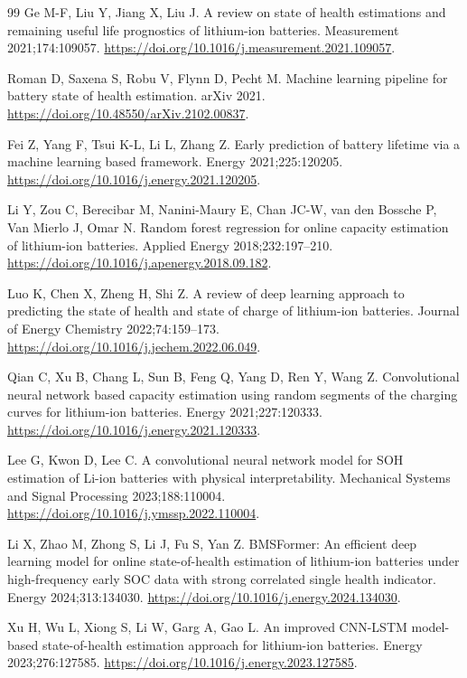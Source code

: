 \begin{thebibliography}{99}
 Ge M-F, Liu Y, Jiang X, Liu J. A review on state of health estimations and remaining useful life prognostics of lithium-ion batteries. Measurement 2021;174:109057. \url{https://doi.org/10.1016/j.measurement.2021.109057}.

 Roman D, Saxena S, Robu V, Flynn D, Pecht M. Machine learning pipeline for battery state of health estimation. arXiv 2021. \url{https://doi.org/10.48550/arXiv.2102.00837}.

 Fei Z, Yang F, Tsui K-L, Li L, Zhang Z. Early prediction of battery lifetime via a machine learning based framework. Energy 2021;225:120205. \url{https://doi.org/10.1016/j.energy.2021.120205}.

 Li Y, Zou C, Berecibar M, Nanini-Maury E, Chan JC-W, van den Bossche P, Van Mierlo J, Omar N. Random forest regression for online capacity estimation of lithium-ion batteries. Applied Energy 2018;232:197–210. \url{https://doi.org/10.1016/j.apenergy.2018.09.182}.

 Luo K, Chen X, Zheng H, Shi Z. A review of deep learning approach to predicting the state of health and state of charge of lithium-ion batteries. Journal of Energy Chemistry 2022;74:159–173. \url{https://doi.org/10.1016/j.jechem.2022.06.049}.

 Qian C, Xu B, Chang L, Sun B, Feng Q, Yang D, Ren Y, Wang Z. Convolutional neural network based capacity estimation using random segments of the charging curves for lithium-ion batteries. Energy 2021;227:120333. \url{https://doi.org/10.1016/j.energy.2021.120333}.

 Lee G, Kwon D, Lee C. A convolutional neural network model for SOH estimation of Li-ion batteries with physical interpretability. Mechanical Systems and Signal Processing 2023;188:110004. \url{https://doi.org/10.1016/j.ymssp.2022.110004}.

 Li X, Zhao M, Zhong S, Li J, Fu S, Yan Z. BMSFormer: An efficient deep learning model for online state-of-health estimation of lithium-ion batteries under high-frequency early SOC data with strong correlated single health indicator. Energy 2024;313:134030. \url{https://doi.org/10.1016/j.energy.2024.134030}.

 Xu H, Wu L, Xiong S, Li W, Garg A, Gao L. An improved CNN-LSTM model-based state-of-health estimation approach for lithium-ion batteries. Energy 2023;276:127585. \url{https://doi.org/10.1016/j.energy.2023.127585}.


\end{thebibliography}
